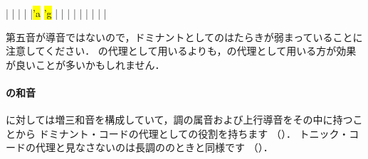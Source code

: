 \documentclass[dvipdfmx,uplatex,b5paper,openany,jbase=12Q,nomag*,textwidth-limit=44%
               ]{gachimuchi}
\begin{document}
\begin{floatMusic}[pos=ht]
  \Startpiece%
  \znotes|\en
  \NOTes
  |%
  \en\bar
  \NOTEs
  |%
  \en\doublebar
  \NOTes
  |\hl{'a}%
  \hl{'g}%
  \en\bar
  \NOTEs
  |%
  \en\doublebar
  \NOTes
  |%
  \en\bar
  \NOTEs
  |%
  \en\doublebar
  \znotes|\en
  \NOTes
  \zchordsl{\Mdline}%
  |%
  \en\bar
  \NOTes
  \Mryaku\sk%
  |\Mryaku\sk%
  \en\setdoublebar
  \endpiece%
\end{floatMusic}

第五音が導音ではないので，ドミナントとしてのはたらきが弱まっていることに注意してください．
の代理として用いるよりも，の代理として用いる方が効果が良いことが多いかもしれません．

\paragraph{\bFlat\Gniii\Aug の和音}
\bFlat\Gniii に対して\bFlat\Gniii\Aug は増三和音を構成していて，調の属音および上行導音をその中に持つことから
ドミナント・コードの代理としての役割を持ちます
（）．
トニック・コードの代理と見なさないのは長調の\bFlat\Gnvi\Aug のときと同様です
（）．
\end{document}
